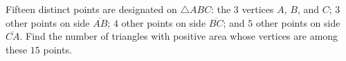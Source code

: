 Fifteen distinct points are designated on $\triangle ABC$: the 3 vertices $A$, $B$, and $C$; $3$ other points on side $\overline{AB}$; $4$ other points on side $\overline{BC}$; and $5$ other points on side $\overline{CA}$. Find the number of triangles with positive area whose vertices are among these $15$ points.